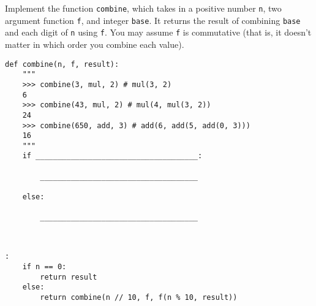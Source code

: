 \begin{blocksection}
\question Implement the function \texttt{combine}, which takes in a positive number \texttt{n}, two argument function \texttt{f}, and integer \texttt{base}. It returns the result of combining \texttt{base} and each digit of \texttt{n} using \texttt{f}. You may assume \texttt{f} is commutative (that is, it doesn't matter in which order you combine each value). \\

\begin{lstlisting}
def combine(n, f, result):
    """
    >>> combine(3, mul, 2) # mul(3, 2)
    6
    >>> combine(43, mul, 2) # mul(4, mul(3, 2))
    24
    >>> combine(650, add, 3) # add(6, add(5, add(0, 3)))
    16
    """
    if _____________________________________:

        ____________________________________

    else:

        ____________________________________

				
\end{lstlisting}

\begin{solution}[1in]
\begin{lstlisting}:
    if n == 0:
        return result
    else:
        return combine(n // 10, f, f(n % 10, result))
\end{lstlisting}
\end{solution}
\end{blocksection}
